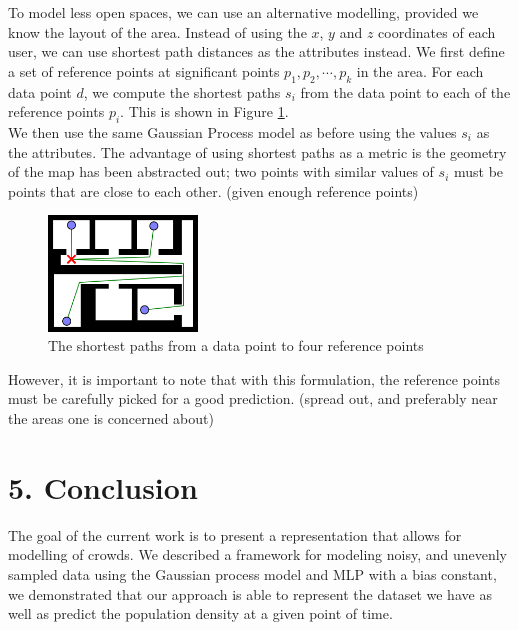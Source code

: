\documentclass[letterpaper]{article}
\begin{document}
To model less open spaces, we can use an alternative modelling, provided we know the layout of the area. Instead of using the $x$, $y$ and $z$ coordinates of each user, we can use shortest path distances as the attributes instead. We first define a set of reference points at significant points $p_1,p_2,\cdots,p_k$ in the area. For each data point $d$, we compute the shortest paths $s_i$ from the data point to each of the reference points $p_i$. This is shown in Figure \ref{fig:spaths}. \\

We then use the same Gaussian Process model as before using the values $s_i$ as the attributes. The advantage of using shortest paths as a metric is the geometry of the map has been abstracted out; two points with similar values of $s_i$ must be points that are close to each other. (given enough reference points)\\

\begin{figure}[h!]
  \centering
    \includegraphics[width=150px,natwidth=570,natheight=442]{shortestpaths.png}
  \caption{The shortest paths from a data point to four reference points}
  \label{fig:spaths}
\end{figure}

However, it is important to note that with this formulation, the reference points must be carefully picked for a good prediction. (spread out, and preferably near the areas one is concerned about) \\


\section{5.  Conclusion}

The goal of the current work is to present a representation that allows for modelling of crowds. We described a framework for modeling noisy, and unevenly sampled
data using the Gaussian process model and MLP with a bias constant, we demonstrated that our approach is able to represent the dataset we have as well as predict the population density at a given point of time.
\end{document}
